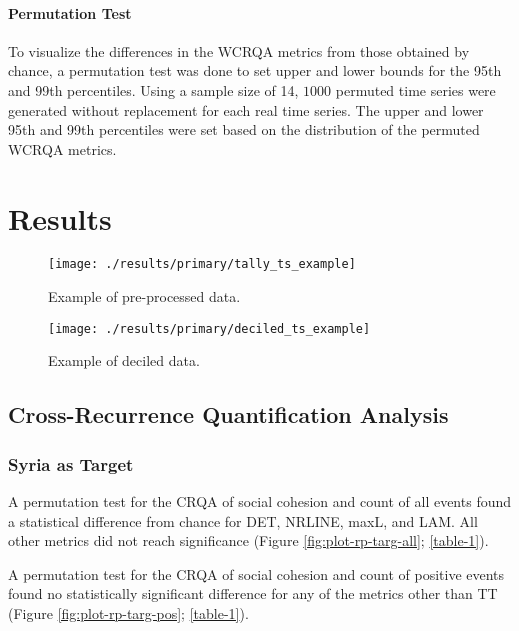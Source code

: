 \documentclass[english,man]{apa6}
\begin{document}
\hypertarget{permutation-test-1}{%
\paragraph{Permutation Test}\label{permutation-test-1}}

To visualize the differences in the WCRQA metrics from those obtained by
chance, a permutation test was done to set upper and lower bounds for the
95th and 99th percentiles. Using a sample size of 14, \(1000\) permuted
time series were generated without replacement for each real time series. The
upper and lower 95th and 99th percentiles were set based on the distribution
of the permuted WCRQA metrics.

\hypertarget{results}{%
\section{Results}\label{results}}

\begin{figure}
\texttt{[image: ./results/primary/tally\_ts\_example]} \caption{Example of pre-processed data.}\label{fig:raw-ts}
\end{figure}

\begin{figure}
\texttt{[image: ./results/primary/deciled\_ts\_example]} \caption{Example of deciled data.}\label{fig:deciled-ts}
\end{figure}

\hypertarget{cross-recurrence-quantification-analysis-1}{%
\subsection{Cross-Recurrence Quantification Analysis}\label{cross-recurrence-quantification-analysis-1}}

\hypertarget{syria-as-target}{%
\subsubsection{Syria as Target}\label{syria-as-target}}

A permutation test for the CRQA of social cohesion and count of all events
found a statistical difference from chance for DET, NRLINE, maxL, and LAM.
All other metrics did not reach significance (Figure \ref{fig:plot-rp-targ-all};
\autoref{table-1}).

A permutation test for the CRQA of social cohesion and
count of positive events found no statistically significant difference for any
of the metrics other than TT (Figure \ref{fig:plot-rp-targ-pos};
\autoref{table-1}).
\end{document}
